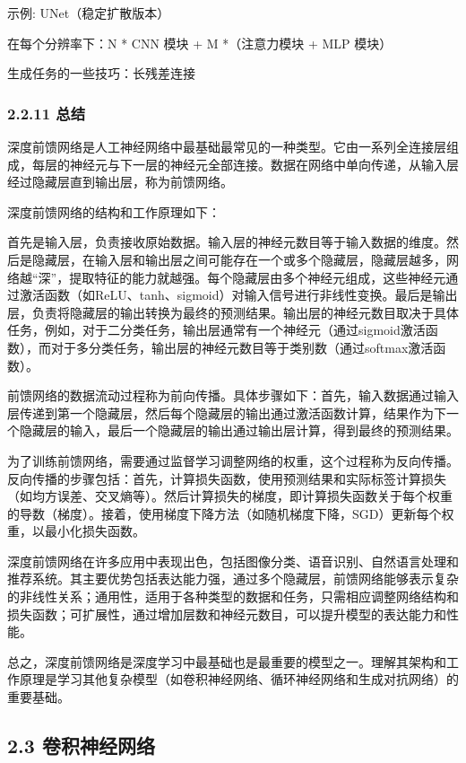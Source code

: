 示例: UNet（稳定扩散版本）

在每个分辨率下：N * CNN 模块 + M *（注意力模块 + MLP 模块）

生成任务的一些技巧：长残差连接

\subsubsection{\texorpdfstring{\textbf{2.2.11
总结}}{2.2.11 总结}}\label{2211-ux603bux7ed3}

深度前馈网络是人工神经网络中最基础最常见的一种类型。它由一系列全连接层组成，每层的神经元与下一层的神经元全部连接。数据在网络中单向传递，从输入层经过隐藏层直到输出层，称为前馈网络。

深度前馈网络的结构和工作原理如下：

首先是输入层，负责接收原始数据。输入层的神经元数目等于输入数据的维度。然后是隐藏层，在输入层和输出层之间可能存在一个或多个隐藏层，隐藏层越多，网络越``深''，提取特征的能力就越强。每个隐藏层由多个神经元组成，这些神经元通过激活函数（如ReLU、tanh、sigmoid）对输入信号进行非线性变换。最后是输出层，负责将隐藏层的输出转换为最终的预测结果。输出层的神经元数目取决于具体任务，例如，对于二分类任务，输出层通常有一个神经元（通过sigmoid激活函数），而对于多分类任务，输出层的神经元数目等于类别数（通过softmax激活函数）。

前馈网络的数据流动过程称为前向传播。具体步骤如下：首先，输入数据通过输入层传递到第一个隐藏层，然后每个隐藏层的输出通过激活函数计算，结果作为下一个隐藏层的输入，最后一个隐藏层的输出通过输出层计算，得到最终的预测结果。

为了训练前馈网络，需要通过监督学习调整网络的权重，这个过程称为反向传播。反向传播的步骤包括：首先，计算损失函数，使用预测结果和实际标签计算损失（如均方误差、交叉熵等）。然后计算损失的梯度，即计算损失函数关于每个权重的导数（梯度）。接着，使用梯度下降方法（如随机梯度下降，SGD）更新每个权重，以最小化损失函数。

深度前馈网络在许多应用中表现出色，包括图像分类、语音识别、自然语言处理和推荐系统。其主要优势包括表达能力强，通过多个隐藏层，前馈网络能够表示复杂的非线性关系；通用性，适用于各种类型的数据和任务，只需相应调整网络结构和损失函数；可扩展性，通过增加层数和神经元数目，可以提升模型的表达能力和性能。

总之，深度前馈网络是深度学习中最基础也是最重要的模型之一。理解其架构和工作原理是学习其他复杂模型（如卷积神经网络、循环神经网络和生成对抗网络）的重要基础。

\subsection{\texorpdfstring{\textbf{2.3
卷积神经网络}}{2.3 卷积神经网络}}\label{23-ux5377ux79efux795eux7ecfux7f51ux7edc}

